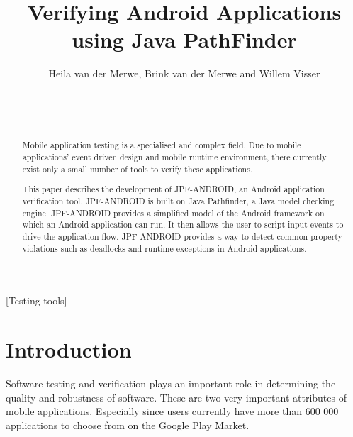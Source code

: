 \documentclass{acm_proc_article-sp}
\begin{document}
\title{Verifying Android Applications using Java PathFinder}


\author{%
\alignauthor Heila van der Merwe, Brink van der Merwe and Willem Visser\\
       \\
       \\
       \\
}

\maketitle

\begin{abstract}
Mobile application testing is a specialised and complex field. Due to mobile applications' event driven design and mobile runtime
environment, there currently exist only a small number of tools to verify these applications.

This paper describes the development of JPF-ANDROID, an Android application verification tool. JPF-ANDROID is built on Java Pathfinder, 
a Java model checking engine. JPF-ANDROID provides a simplified model of the Android framework on which an Android application can run. It then allows
the user to script input events to drive the application flow. JPF-ANDROID provides a way to detect common property violations such as deadlocks and runtime exceptions
in Android applications.
\end{abstract}

[Testing tools]



\section{Introduction}
Software testing and verification plays an important role in determining the quality and robustness of software. These are two very
important attributes of mobile applications. Especially since users currently have more than 600 000 applications to choose from on the
Google Play Market.
\end{document}
